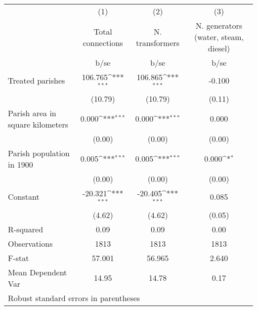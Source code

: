 {
\def\sym#1{\ifmmode^{#1}\else\(^{#1}\)\fi}
\begin{tabular}{l*{3}{c}}
\hline\hline
                    &\multicolumn{1}{c}{(1)}         &\multicolumn{1}{c}{(2)}         &\multicolumn{1}{c}{(3)}         \\
                    &Total connections         &N. transformers         &N. generators (water, steam, diesel)         \\
                    &        b/se         &        b/se         &        b/se         \\
\hline
Treated parishes    &     106.765\sym{***}&     106.865\sym{***}&      -0.100         \\
                    &     (10.79)         &     (10.79)         &      (0.11)         \\
Parish area in square kilometers&       0.000\sym{***}&       0.000\sym{***}&       0.000         \\
                    &      (0.00)         &      (0.00)         &      (0.00)         \\
Parish population in 1900&       0.005\sym{***}&       0.005\sym{***}&       0.000\sym{*}  \\
                    &      (0.00)         &      (0.00)         &      (0.00)         \\
Constant            &     -20.321\sym{***}&     -20.405\sym{***}&       0.085         \\
                    &      (4.62)         &      (4.62)         &      (0.05)         \\
\hline
R-squared           &        0.09         &        0.09         &        0.00         \\
Observations        &        1813         &        1813         &        1813         \\
F-stat              &      57.001         &      56.965         &       2.640         \\
Mean Dependent Var  &       14.95         &       14.78         &        0.17         \\
\hline\hline
\multicolumn{4}{l}{\footnotesize Robust standard errors in parentheses}\\
\end{tabular}
}
